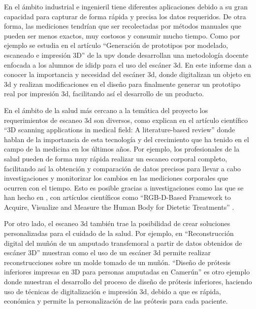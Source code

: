 En el ámbito industrial e ingenieril tiene diferentes aplicaciones debido a su gran capacidad para capturar de forma rápida y precisa los datos requeridos.
De otra forma, las mediciones tendrían que ser recolectadas por métodos manuales que pueden ser menos exactos, muy costosos y consumir mucho tiempo.
Como por ejemplo se estudia en el artículo ``Generación de prototipos por modelado, escaneado e impresión 3D'' \citep{RayonEncinas2015} de la \gls{upv} donde desarrollan una metodología docente enfocada a los alumnos de \gls{ididp} para el uso del escáner \gls{3d}. En este informe dan a conocer la importancia y necesidad del escáner \gls{3d}, donde digitalizan un objeto en \gls{3d} y realizan modificaciones en el diseño para finalmente generar un prototipo real por impresión \gls{3d}, facilitando así el desarrollo de un producto.

En el ámbito de la salud más cercano a la temática del proyecto los requerimientos de escaneo \gls{3d} son diversos, como explican en el artículo científico ``3D scanning applications in medical field: A literature-based review'' \citep{Haleem2019} donde hablan de la importancia de esta tecnología y del crecimiento que ha tenido en el campo de la medicina en los últimos años.
Por ejemplo, los profesionales de la salud pueden de forma muy rápida realizar un escaneo corporal completo, facilitando así la obtención y comparación de datos precisos para llevar a cabo investigaciones y monitorizar los cambios en las mediciones corporales que ocurren con el tiempo.
Esto es posible gracias a investigaciones como las que se han hecho en \cite{Tech4DietResultados}, con artículos científicos como ``RGB-D-Based Framework to Acquire, Visualize and Measure the Human Body for Dietetic Treatments'' \citep{Fuster-Guillo2020}.

Por otro lado, el escaneo \gls{3d} también trae la posibilidad de crear soluciones personalizadas para el cuidado de la salud.
Por ejemplo, en ``Reconstrucción digital del muñón de un amputado transfemoral a partir de datos obtenidos de escáner 3D'' \citep{isaza2011reconstruccion} muestran como el uso de un escáner \gls{3d} permite realizar reconstrucciones sobre un molde tomado de un muñón.
``Diseño de prótesis inferiores impresas en 3D para personas amputadas en Camerún'' \citep{martinez2020diseno} es otro ejemplo donde muestran el desarrollo del proceso de diseño de prótesis inferiores, haciendo uso de técnicas de digitalización e impresión \gls{3d}, debido a que es rápida, económica y permite la personalización de las prótesis para cada paciente.

